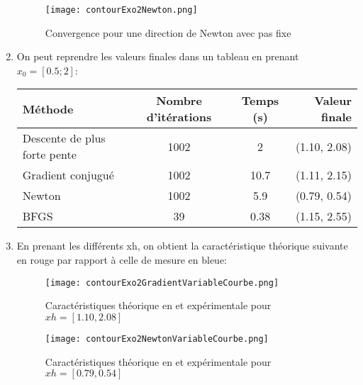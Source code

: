 \documentclass[12pt,a4paper,titlepage]{article}
\begin{document}
\begin{enumerate}
{             \begin{figure}[H]
                \centering
                \texttt{[image: contourExo2Newton.png]}
                \caption{Convergence pour une direction de Newton avec pas fixe}
            \end{figure}
    }
    
    \item{On peut reprendre les valeurs finales dans un tableau en prenant $x_0=[0.5; 2]$:
    	\begin{table}[H]
                \begin{tabularx}{\textwidth}{ l | c | c | r}
                    \hline
                    Méthode & Nombre d'itérations & Temps (s) & Valeur finale \\
                    \hline
                    Descente de plus forte pente & 1002 & 2 & (1.10, 2.08) \\
                    \hline
                    Gradient conjugué & 1002  &  10.7 & (1.11, 2.15)\\
                    \hline
                    Newton &  1002 & 5.9 & (0.79, 0.54) \\
                    \hline
                    BFGS & 39 & 0.38 & (1.15, 2.55)\\
                    \hline
                \end{tabularx}
            \end{table}
    }
    
    \item{En prenant les différents xh, on obtient la caractéristique théorique  suivante en rouge par rapport à celle de mesure en bleue:
   	 \begin{figure}[H]
                \centering
                \texttt{[image: contourExo2GradientVariableCourbe.png]}
                \caption{Caractéristiques théorique en et expérimentale pour $xh = [1.10, 2.08]$ }
            \end{figure}
            
            \begin{figure}[H]
                \centering
                \texttt{[image: contourExo2NewtonVariableCourbe.png]}
                \caption{Caractéristiques théorique en et expérimentale pour $xh = [0.79, 0.54]$ }
            \end{figure}
        }
\end{enumerate}

\newpage
\end{document}
